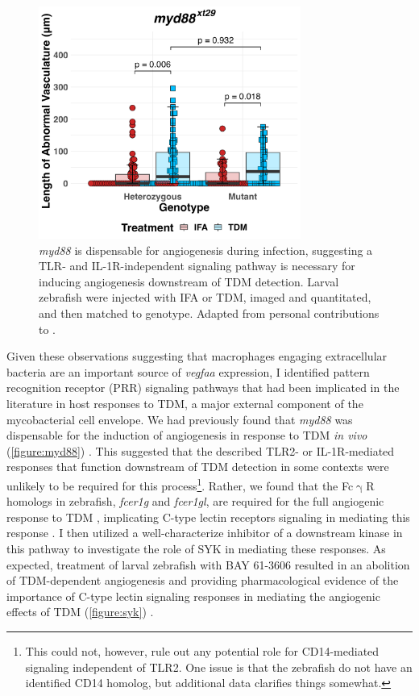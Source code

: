 \begin{figure}
\centering
\includegraphics[height=3in]{images/JB96_myd88_TDM_120522.png}
\caption[\textit{myd88} is dispensable for angiogenesis]{\textit{myd88} is dispensable for angiogenesis during infection, suggesting a TLR\hyp{} and IL\hyp{}1R\hyp{}independent signaling pathway is necessary for inducing angiogenesis downstream of TDM detection. Larval zebrafish were injected with IFA or TDM, imaged and quantitated, and then matched to genotype. Adapted from personal contributions to \citet{Walton2018}.}
\label{figure:myd88}

\end{figure}

Given these observations suggesting that macrophages engaging extracellular bacteria are an important source of \textit{vegfaa} expression, I identified pattern recognition receptor (PRR) signaling pathways that had been implicated in the literature in host responses to TDM, a major external component of the mycobacterial cell envelope. We had previously found that \textit{myd88} was dispensable for the induction of angiogenesis in response to TDM \textit{in vivo} (\autoref{figure:myd88}) \citep{Bowdish2009, Walton2018}. This suggested that the described TLR2\hyp{} or IL\hyp{}1R\hyp{}mediated responses that function downstream of TDM detection in some contexts were unlikely to be required for this process\footnote{This could not, however, rule out any potential role for CD14\hyp{}mediated signaling independent of TLR2. One issue is that the zebrafish do not have an identified CD14 homolog, but additional data clarifies things somewhat.}. Rather, we found that the Fc$\upgamma$R homologs in zebrafish, \textit{fcer1g} and \textit{fcer1gl}, are required for the full angiogenic response to TDM \citep{Walton2018}, implicating C\hyp{}type lectin receptors signaling in mediating this response \citep{Richardson2014, Zhao2014}. I then utilized a well-characterize inhibitor of a downstream kinase in this pathway to investigate the role of SYK in mediating these responses. As expected, treatment of larval zebrafish with BAY 61-3606 resulted in an abolition of TDM-dependent angiogenesis and providing pharmacological evidence of the importance of C-type lectin signaling responses in mediating the angiogenic effects of TDM (\autoref{figure:syk}) \citep{Ghotra2015, Xu2018b}. 

